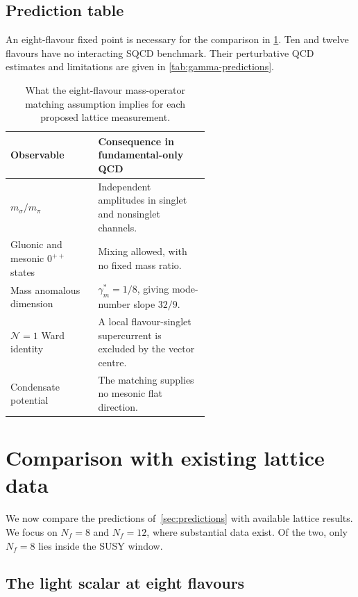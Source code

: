 \documentclass[11pt,a4paper]{article}
\theoremstyle{plain}
\theoremstyle{definition}
\theoremstyle{remark}
\newcommand{\Nf}{N_{\!f}}
\begin{document}
\subsection{Prediction table}

An eight-flavour fixed point is necessary for the comparison in
\cref{tab:predictions}.  Ten and twelve flavours have no interacting
SQCD benchmark.  Their perturbative QCD estimates and limitations are
given in \cref{tab:gamma-predictions}.

\begin{table}[ht]
\centering
\renewcommand{\arraystretch}{1.25}
\caption{What the eight-flavour mass-operator matching assumption
  implies for each proposed lattice measurement.}
\label{tab:predictions}
\begin{tabular}{@{}l p{0.57\linewidth}@{}}
\toprule
Observable & Consequence in fundamental-only QCD \\
\midrule
$m_\sigma/m_\pi$ & Independent amplitudes in singlet and nonsinglet channels. \\
Gluonic and mesonic $0^{++}$ states & Mixing allowed, with no fixed mass ratio. \\
Mass anomalous dimension & $\gamma_m^*=1/8$, giving mode-number slope $32/9$. \\
$\mathcal N=1$ Ward identity & A local flavour-singlet supercurrent is excluded by the vector centre. \\
Condensate potential & The matching supplies no mesonic flat direction. \\
\bottomrule
\end{tabular}
\end{table}

\section{Comparison with existing lattice data}
\label{sec:comparison}

We now compare the predictions of~\cref{sec:predictions} with
available lattice results.  We focus on $\Nf = 8$ and $\Nf = 12$,
where substantial data exist.  Of the two, only $\Nf = 8$ lies inside
the SUSY window.

\subsection{The light scalar at eight flavours}
\end{document}

